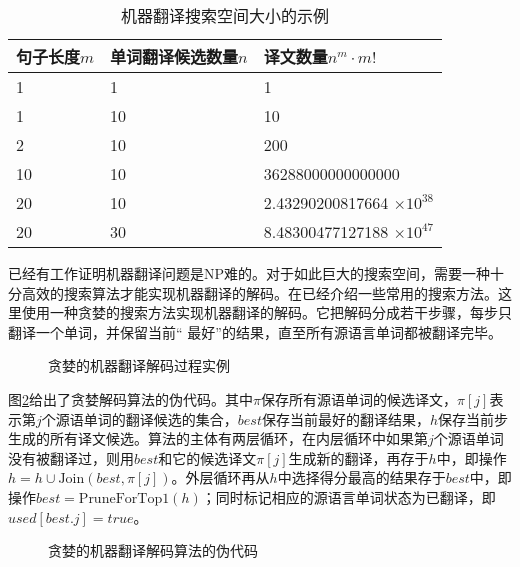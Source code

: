 \begin{table}[htp]{
\begin{center}
\caption{机器翻译搜索空间大小的示例}
\label{tab:5-2}
\begin{tabular}{l | l | l}
句子长度$m$ & 单词翻译候选数量$n$ & 译文数量$n^m \cdot m!$ \\ \hline
1 & 1 & 1 \\
1 & 10 & 10 \\
2 & 10 & 200 \\
10 & 10 & 36288000000000000 \\
20 & 10 & 2.43290200817664 $\times 10^{38}$ \\
20 & 30 & 8.48300477127188 $\times 10^{47}$
\end{tabular}
\end{center}
}\end{table}

\parinterval 已经有工作证明机器翻译问题是NP难的。对于如此巨大的搜索空间，需要一种十分高效的搜索算法才能实现机器翻译的解码。在{\chaptertwo}已经介绍一些常用的搜索方法。这里使用一种贪婪的搜索方法实现机器翻译的解码。它把解码分成若干步骤，每步只翻译一个单词，并保留当前“ 最好”的结果，直至所有源语言单词都被翻译完毕。

\begin{figure}[htp]
    \centering
\subfigure{}
\subfigure{}
    \caption{贪婪的机器翻译解码过程实例}
    \label{fig:5-11}
\end{figure}

\parinterval 图\ref{fig:5-10}给出了贪婪解码算法的伪代码。其中$\pi$保存所有源语单词的候选译文，$\pi[j]$表示第$j$个源语单词的翻译候选的集合，$best$保存当前最好的翻译结果，$h$保存当前步生成的所有译文候选。算法的主体有两层循环，在内层循环中如果第$j$个源语单词没有被翻译过，则用$best$和它的候选译文$\pi[j]$生成新的翻译，再存于$h$中，即操作$h=h\cup{\textrm{Join}(best,\pi[j])}$。外层循环再从$h$中选择得分最高的结果存于$best$中，即操作$best=\textrm{PruneForTop1}(h)$；同时标记相应的源语言单词状态为已翻译，即$used[best.j]=true$。

\begin{figure}[htp]
    \centering

    \caption{贪婪的机器翻译解码算法的伪代码}
    \label{fig:5-10}
\end{figure}

